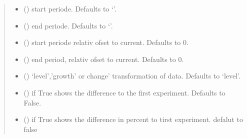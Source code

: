 \documentclass[letterpaper,10pt,english]{sphinxmanual}
\begin{document}
\begin{fulllineitems}
\begin{fulllineitems}
\begin{quote}
\begin{description}
\begin{itemize}
\item {} 
\sphinxAtStartPar
{} (\sphinxstyleliteralemphasis{\sphinxupquote{, }}) \textendash{} start periode. Defaults to ‘’.

\item {} 
\sphinxAtStartPar
{} (\sphinxstyleliteralemphasis{\sphinxupquote{, }}) \textendash{} end periode. Defaults to ‘’.

\item {} 
\sphinxAtStartPar
{} (\sphinxstyleliteralemphasis{\sphinxupquote{, }}) \textendash{} start periode relativ ofset to current. Defaults to 0.

\item {} 
\sphinxAtStartPar
{} (\sphinxstyleliteralemphasis{\sphinxupquote{, }}) \textendash{} end period, relativ ofset to current. Defaults to 0.

\item {} 
\sphinxAtStartPar
{} (\sphinxstyleliteralemphasis{\sphinxupquote{, }}) \textendash{} ‘level’,’growth’ or change’ transformation of data. Defaults to ‘level’.

\item {} 
\sphinxAtStartPar
{} (\sphinxstyleliteralemphasis{\sphinxupquote{, }}) \textendash{} if True shows the difference to the first experiment. Defaults to False.

\item {} 
\sphinxAtStartPar
{} (\sphinxstyleliteralemphasis{\sphinxupquote{,}}) \textendash{} if True shows the difference in percent to tirst experiment. defalut to false


\end{itemize}
\end{description}
\end{quote}
\end{fulllineitems}
\end{fulllineitems}
\end{document}
